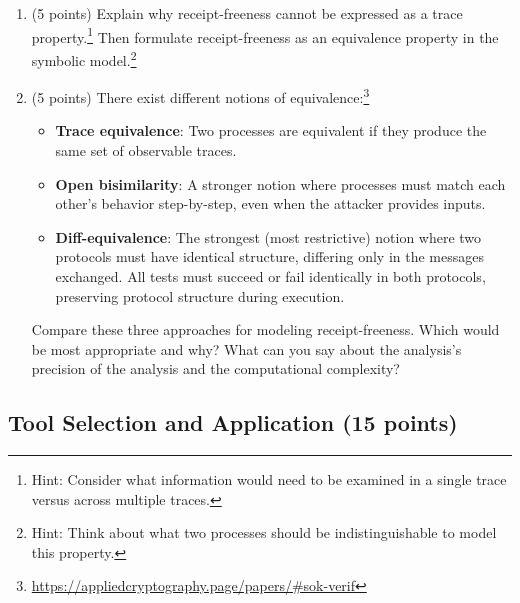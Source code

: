 \documentclass[10pt,a4paper,american]{article}
\begin{document}
\begin{enumerate}
	      \begin{enumerate}
		      \item (5 points) Explain why receipt-freeness cannot be expressed as a trace property.\footnote{Hint: Consider what information would need to be examined in a single trace versus across multiple traces.} Then formulate receipt-freeness as an equivalence property in the symbolic model.\footnote{Hint: Think about what two processes should be indistinguishable to model this property.}
		      \item (5 points) There exist different notions of equivalence:\footnote{\url{https://appliedcryptography.page/papers/\#sok-verif}}
		            \begin{itemize}
			            \item \textbf{Trace equivalence}: Two processes are equivalent if they produce the same set of observable traces.
			            \item \textbf{Open bisimilarity}: A stronger notion where processes must match each other's behavior step-by-step, even when the attacker provides inputs.
			            \item \textbf{Diff-equivalence}: The strongest (most restrictive) notion where two protocols must have identical structure, differing only in the messages exchanged. All tests must succeed or fail identically in both protocols, preserving protocol structure during execution.
		            \end{itemize}
		            Compare these three approaches for modeling receipt-freeness. Which would be most appropriate and why? What can you say about the analysis's precision of the analysis and the computational complexity?
	      \end{enumerate}
\end{enumerate}

\subsection{Tool Selection and Application (15 points)}
\end{document}
